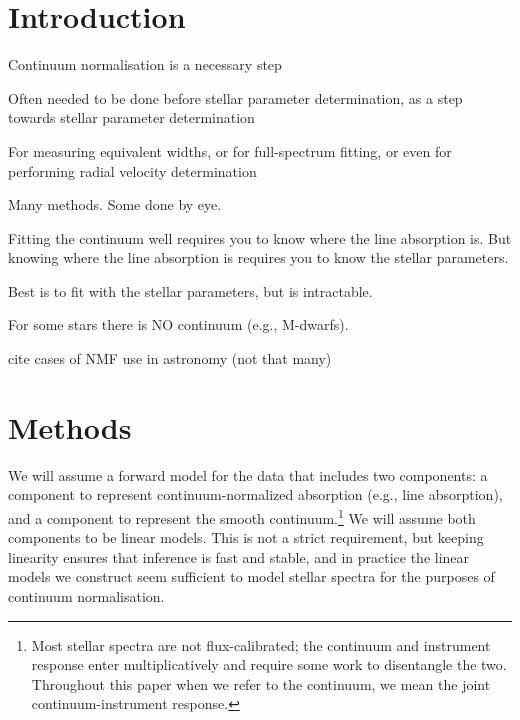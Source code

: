 \documentclass[modern]{aastex631}
\begin{document}
\section{Introduction}\label{sec:intro}

Continuum normalisation is a necessary step

Often needed to be done before stellar parameter determination, as a step towards stellar parameter determination

For measuring equivalent widths, or for full-spectrum fitting, or even for performing radial velocity determination

Many methods. Some done by eye.

Fitting the continuum well requires you to know where the line absorption is. But knowing where the line absorption is requires you to know the stellar parameters.

Best is to fit with the stellar parameters, but is intractable.

For some stars there is NO continuum (e.g., M-dwarfs). 

cite cases of NMF use in astronomy (not that many)


\section{Methods}\label{sec:methods}

We will assume a forward model for the data that includes two components: a component to represent continuum-normalized absorption (e.g., line absorption), and a component to represent the smooth continuum.\footnote{Most stellar spectra are not flux-calibrated; the continuum and instrument response enter multiplicatively and require some work to disentangle the two. Throughout this paper when we refer to the continuum, we mean the joint continuum-instrument response.} We will assume both components to be linear models. This is not a strict requirement, but keeping linearity ensures that  inference is fast and stable, and in practice the linear models we construct seem sufficient to model stellar spectra for the purposes of continuum normalisation.\\
\end{document}
